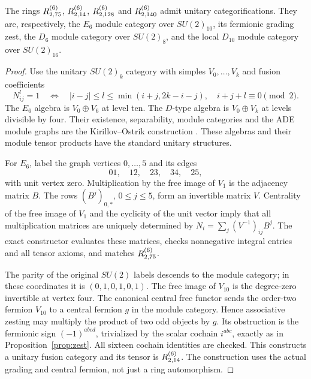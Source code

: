 \begin{proposition}\label{prop:ADEmodels}
The rings $R^{(6)}_{2,75}$, $R^{(6)}_{2,14}$, $R^{(6)}_{2,128}$ and $R^{(6)}_{2,140}$
admit unitary categorifications. They are, respectively, the $E_6$ module
category over $SU(2)_{10}$, its fermionic grading zest, the $D_6$ module
category over $SU(2)_8$, and the local $D_{10}$ module category over
$SU(2)_{16}$.
\end{proposition}
\begin{proof}
Use the unitary $SU(2)_k$ category with simples $V_0,\ldots,V_k$ and
fusion coefficients
\[
 N_{ij}^l=1\quad\Longleftrightarrow\quad
 |i-j|\le l\le\min(i+j,2k-i-j),\quad i+j+l\equiv0\pmod2.
\]
The $E_6$ algebra is $V_0\oplus V_6$ at level ten. The $D$-type algebra
is $V_0\oplus V_k$ at levels divisible by four. Their existence,
separability, module categories and the ADE module graphs are the
Kirillov--Ostrik construction \cite[Theorem~6.1 and Section~7]{KO}.
These algebras and their module tensor products have the standard
unitary structures.

For $E_6$, label the graph vertices $0,\ldots,5$ and its edges
\[
 01,\quad12,\quad23,\quad34,\quad25,
\]
with unit vertex zero. Multiplication by the free image of $V_1$ is the
adjacency matrix $B$. The rows $(B^j)_{0,*}$, $0\le j\le5$, form an
invertible matrix $V$. Centrality of the free image of $V_1$ and the
cyclicity of the unit vector imply that all multiplication matrices are
uniquely determined by
$N_i=\sum_j(V^{-1})_{ij}B^j$. The exact constructor evaluates these
matrices, checks nonnegative integral entries and all tensor axioms,
and matches $R^{(6)}_{2,75}$.

The parity of the original $SU(2)$ labels descends to the module category;
in these coordinates it is $(0,1,0,1,0,1)$. The free image of $V_{10}$
is the degree-zero invertible at vertex four. The canonical central
free functor sends the order-two fermion $V_{10}$ to a central fermion
$g$ in the module category. Hence associative zesting may multiply the
product of two odd objects by $g$. Its obstruction is the fermionic
sign $(-1)^{abcd}$, trivialized by the scalar cochain $i^{abc}$, exactly
as in Proposition~\ref{prop:zest}. All sixteen cochain identities are
checked. This constructs a unitary fusion category and its tensor is
$R^{(6)}_{2,14}$. The construction uses the actual grading and central
fermion, not just a ring automorphism.


\end{proof}
